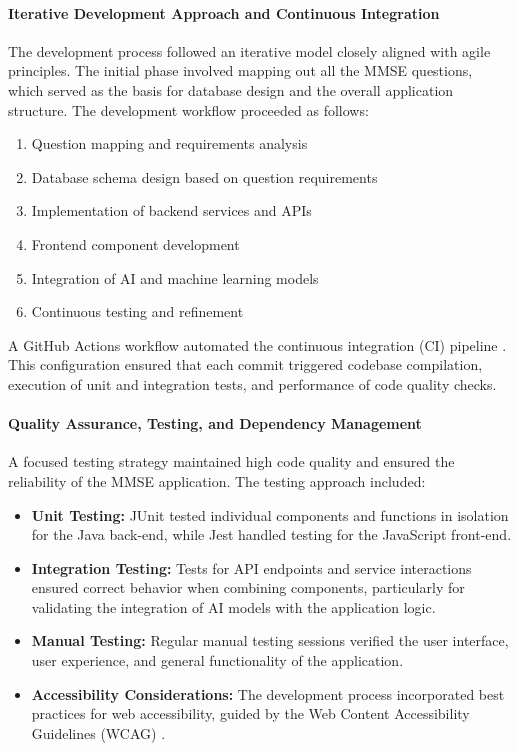 \paragraph{Iterative Development Approach and Continuous Integration}
The development process followed an iterative model closely aligned with agile principles. The initial phase involved mapping out all the MMSE questions, which served as the basis for database design and the overall application structure. The development workflow proceeded as follows:
\begin{enumerate}
\item Question mapping and requirements analysis
\item Database schema design based on question requirements
\item Implementation of backend services and APIs
\item Frontend component development
\item Integration of AI and machine learning models
\item Continuous testing and refinement
\end{enumerate}

A GitHub Actions workflow automated the continuous integration (CI) pipeline \cite{github_actions}. This configuration ensured that each commit triggered codebase compilation, execution of unit and integration tests, and performance of code quality checks.

\paragraph{Quality Assurance, Testing, and Dependency Management}
A focused testing strategy maintained high code quality and ensured the reliability of the MMSE application. The testing approach included:
\begin{itemize}
\item \textbf{Unit Testing:} JUnit tested individual components and functions in isolation for the Java back-end, while Jest handled testing for the JavaScript front-end.
\item \textbf{Integration Testing:} Tests for API endpoints and service interactions ensured correct behavior when combining components, particularly for validating the integration of AI models with the application logic.
\item \textbf{Manual Testing:} Regular manual testing sessions verified the user interface, user experience, and general functionality of the application.
\item \textbf{Accessibility Considerations:} The development process incorporated best practices for web accessibility, guided by the Web Content Accessibility Guidelines (WCAG) \cite{wcag}.
\end{itemize}

